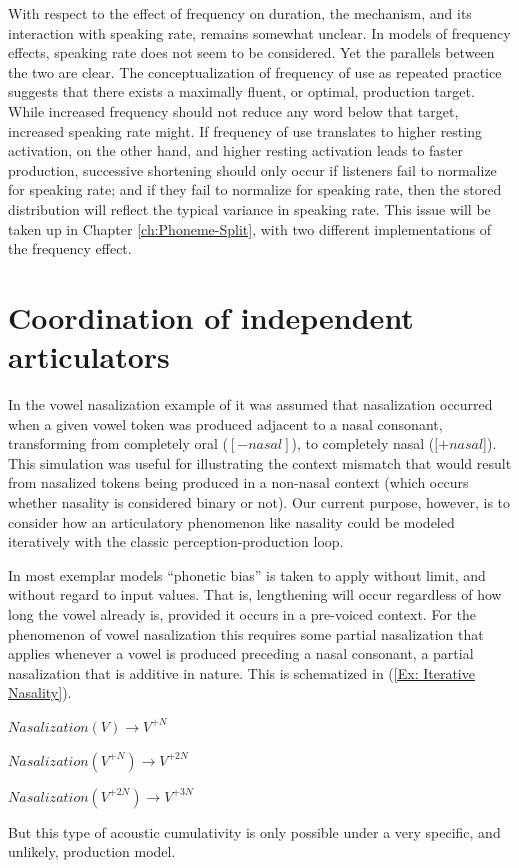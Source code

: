 With respect to the effect of frequency on duration, the mechanism,
and its interaction with speaking rate, remains somewhat unclear.
In models of frequency effects, speaking rate does not seem to be
considered. Yet the parallels between the two are clear. The conceptualization
of frequency of use as repeated practice suggests that there exists
a maximally fluent, or optimal, production target. While increased
frequency should not reduce any word below that target, increased
speaking rate might. If frequency of use translates to higher resting
activation, on the other hand, and higher resting activation leads
to faster production, successive shortening should only occur if listeners
fail to normalize for speaking rate; and if they fail to normalize
for speaking rate, then the stored distribution will reflect the typical
variance in speaking rate. This issue will be taken up in Chapter
\ref{ch:Phoneme-Split}, with two different implementations of the
frequency effect.

\section{Coordination of independent articulators}

In the vowel nasalization example of 
it was assumed that nasalization occurred when a given vowel token
was produced adjacent to a nasal consonant, transforming from completely
oral ($[-nasal]$), to completely nasal ($[+nasal${]}). This simulation
was useful for illustrating the context mismatch that would result
from nasalized tokens being produced in a non-nasal context (which
occurs whether nasality is considered binary or not). Our current
purpose, however, is to consider how an articulatory phenomenon like
nasality could be modeled iteratively with the classic perception-production
loop. 

In most exemplar models ``phonetic bias'' is taken to apply without
limit, and without regard to input values. That is, lengthening will
occur regardless of how long the vowel already is, provided it occurs
in a pre-voiced context. For the phenomenon of vowel nasalization
this requires some partial nasalization that applies whenever a vowel
is produced preceding a nasal consonant, a partial nasalization that
is additive in nature. This is schematized in (\ref{Ex: Iterative Nasality}). 
\begin{covexample}
\label{Ex: Iterative Nasality}$\textit{Nasalization}(V)\rightarrow V^{+N}$

$\textit{Nasalization}(V^{+N})\rightarrow V^{+2N}$

$\textit{Nasalization}(V^{+2N})\rightarrow V^{+3N}$
\end{covexample}
But this type of acoustic cumulativity is only possible under a very
specific, and unlikely, production model. 

